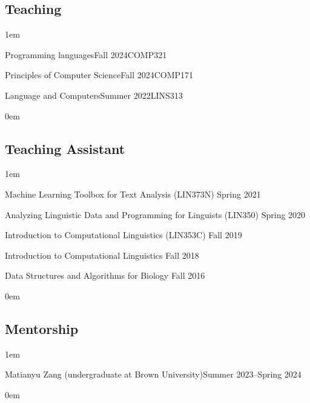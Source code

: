 \subsection{Teaching}
\leftskip1em\relax

  {Programming languages}{Fall 2024}{COMP321}{}
  
  {Principles of Computer Science}{Fall 2024}{COMP171}{}

  {Language and Computers}{Summer 2022}{LINS313}{}

\leftskip0em\relax
  
\subsection{Teaching Assistant}
\leftskip1em\relax
\vspace{0.6\baselineskip}

\textbullet\enspace Machine Learning Toolbox for Text Analysis ({\rmsc LIN373N}) \hfill Spring 2021

\textbullet\enspace Analyzing Linguistic Data and Programming for Linguists ({\rmsc LIN350}) \hfill Spring 2020

\textbullet\enspace Introduction to Computational Linguistics ({\rmsc LIN353C}) \hfill Fall 2019

\textbullet\enspace Introduction to Computational Linguistics \hfill Fall 2018

\textbullet\enspace Data Structures and Algorithms for Biology \hfill Fall 2016

\leftskip0em\relax

\subsection{Mentorship}
\leftskip1em\relax

  {\normalsize Matianyu Zang (undergraduate at Brown University)}{\normalsize Summer 2023--Spring 2024}{}{}

\leftskip0em\relax
